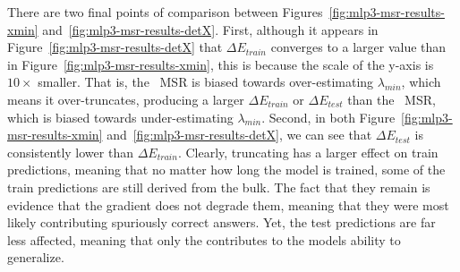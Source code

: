 There are two final points of comparison between Figures~\ref{fig:mlp3-msr-results-xmin} and~\ref{fig:mlp3-msr-results-detX}.
%
First, 
although it appears in Figure~\ref{fig:mlp3-msr-results-detX} that $\Delta E_{train}$ converges to a larger value than in Figure~\ref{fig:mlp3-msr-results-xmin}, this is because the scale of the y-axis is $10\times$ smaller. 
That is, the \POWERLAW~MSR is biased towards over-estimating $\lambda_{min}$, which means it over-truncates, producing a 
larger $\Delta E_{train}$ or $\Delta E_{test}$ 
than the \TRACELOG~MSR, which is biased towards under-estimating $\lambda_{min}$. 
%
Second,
in both Figure~\ref{fig:mlp3-msr-results-xmin} and~\ref{fig:mlp3-msr-results-detX}, we can see that $\Delta E_{test}$ is consistently lower than $\Delta E_{train}$. 
Clearly, truncating has a larger effect on train predictions, meaning that no matter how long the model is trained, some 
of the train predictions are still derived from the bulk. The fact that they remain is evidence that the gradient does not degrade them, meaning that they were most likely contributing spuriously correct answers. Yet, the test predictions are far less affected, meaning that only the \EffectiveCorrelationSpace contributes to the models ability to generalize.








